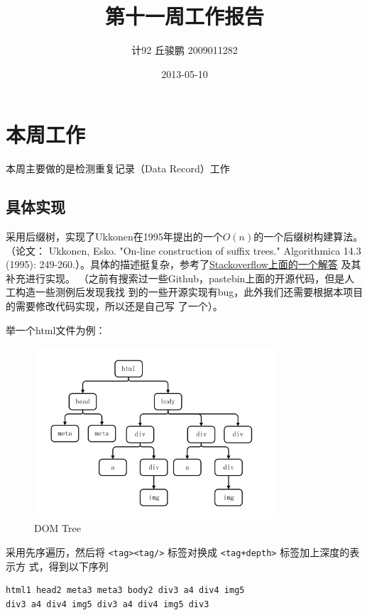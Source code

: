 \documentclass{article}
\author{计92 丘骏鹏 2009011282}
\date{2013-05-10}
\title{第十一周工作报告}
\begin{document}
\maketitle

\section{本周工作}
\label{sec-1}
本周主要做的是检测重复记录（Data Record）工作
\subsection{具体实现}
\label{sec-1-1}
采用后缀树，实现了Ukkonen在1995年提出的一个\(O(n)\)的一个后缀树构建算法。（论文：
Ukkonen, Esko. "On-line construction of suffix trees." Algorithmica 14.3 (1995):
249-260.）。具体的描述挺复杂，参考了\href{http://stackoverflow.com/questions/9452701/ukkonens-suffix-tree-algorithm-in-plain-english}{Stackoverflow上面的一个解答} 及其补充进行实现。
（之前有搜索过一些Github，pastebin上面的开源代码，但是人工构造一些测例后发现我找
到的一些开源实现有bug，此外我们还需要根据本项目的需要修改代码实现，所以还是自己写
了一个）。

举一个html文件为例：
\begin{figure}[htb]
\centering
\includegraphics[width=0.8\textwidth]{./domtree.png}
\caption{\label{fig:1}DOM Tree}
\end{figure}

采用先序遍历，然后将 \texttt{<tag><tag/>} 标签对换成 \texttt{<tag+depth>} 标签加上深度的表示方
式，得到以下序列
\begin{verbatim}
html1 head2 meta3 meta3 body2 div3 a4 div4 img5
div3 a4 div4 img5 div3 a4 div4 img5 div3
\end{verbatim}
\end{document}
